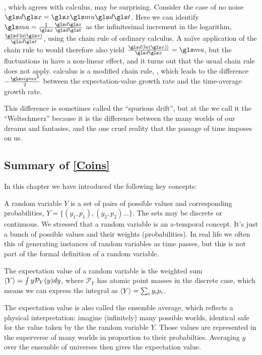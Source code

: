 , which agrees with \Ito calculus, may be surprising.
Consider the case of no noise $\gd\x=\x \gmu \gd\t$. Here we can identify $\gmu=\frac{1}{\x}\frac{\gd\x}{\gd\t}$ 
as the infinitesimal increment in the logarithm, $\frac{\gd \ln(\x)}{\gd\t}$, using the chain rule of ordinary calculus. 
A na\"ive application of the chain rule to  would therefore also yield $\frac{\gd \ave{\ln(\x)}}{\gd\x}=\gmu$, 
but the fluctuations in \GBM have a non-linear effect, and it turns out that the usual chain rule does not apply. \Ito
calculus is a modified chain rule, , which leads to the difference $-\frac{\gsigma^2}{2}$ between the 
expectation-value growth rate and the time-average
growth rate. 

This difference is sometimes called the ``spurious drift'', but at the \LML we call it the ``Weltschmerz'' because 
it is the difference between the many worlds of our dreams and fantasies, and the one cruel reality that 
the passage of time imposes on us.
\newpage

\subsection*{Summary of \cref{Coins}}

In this chapter we have introduced the following key concepts:
\bi
\item[\bf Random variable]
A random variable $Y$ is a set of pairs of possible values and  corresponding probabilities, $Y=\{(y_1, p_1),(y_2, p_2)...\}$.
The sets may be discrete or continuous. We stressed that a random variable is an a-temporal concept. It's just a bunch of possible values and their weights (probabilities). In real life we often this of generating instances of random variables as time passes, but this is not part of the formal definition of a random variable.

\item[{\bf Expectation value}]
The expectation value of a random variable is the weighted sum $\left\langle Y \right\rangle=\int y \mathcal{P}_Y(y) dy$, where $\mathcal{P}_Y$ has atomic point masses in the discrete case, which means we can express the integral as $\left\langle Y \right\rangle=\sum_i y_i p_i$.

The expectation value is also called the ensemble average, which reflects a physical interpretation: imagine (infinitely) many possible worlds, identical safe for the value taken by the the random variable $Y$. Those values are represented in the superverse of many worlds in proportion to their probabilties. Averaging $y$ over the ensemble of universes then gives the expectation value.

